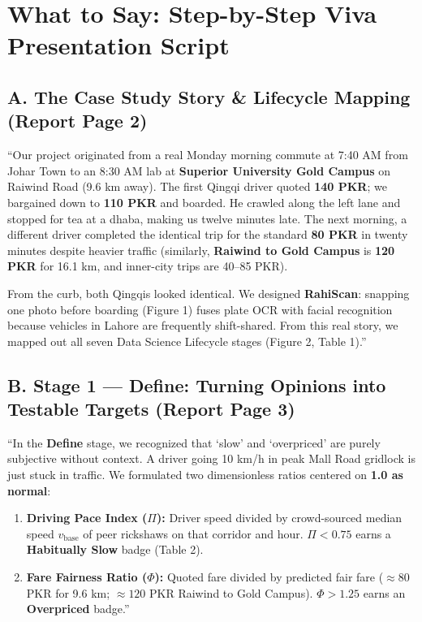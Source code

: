 \documentclass[10pt, a4paper]{article}
\begin{document}
\section{What to Say: Step-by-Step Viva Presentation Script}

\subsection{A. The Case Study Story \& Lifecycle Mapping (Report Page 2)}
\begin{speaking}
\footnotesize
``Our project originated from a real Monday morning commute at 7:40 AM from Johar Town to an 8:30 AM lab at \textbf{Superior University Gold Campus} on Raiwind Road (9.6 km away). The first Qingqi driver quoted \textbf{140 PKR}; we bargained down to \textbf{110 PKR} and boarded. He crawled along the left lane and stopped for tea at a dhaba, making us twelve minutes late. The next morning, a different driver completed the identical trip for the standard \textbf{80 PKR} in twenty minutes despite heavier traffic (similarly, \textbf{Raiwind to Gold Campus} is \textbf{120 PKR} for 16.1 km, and inner-city trips are 40--85 PKR).

From the curb, both Qingqis looked identical. We designed \textbf{RahiScan}: snapping one photo before boarding (Figure 1) fuses plate OCR with facial recognition because vehicles in Lahore are frequently shift-shared. From this real story, we mapped out all seven Data Science Lifecycle stages (Figure 2, Table 1).''
\end{speaking}

\subsection{B. Stage 1 --- Define: Turning Opinions into Testable Targets (Report Page 3)}
\begin{speaking}
\footnotesize
``In the \textbf{Define} stage, we recognized that `slow' and `overpriced' are purely subjective without context. A driver going 10 km/h in peak Mall Road gridlock is just stuck in traffic. We formulated two dimensionless ratios centered on \textbf{1.0 as normal}:
\begin{enumerate}\setlength{\itemsep}{0.8pt}\setlength{\parskip}{0pt}
  \item \textbf{Driving Pace Index (\(\Pi\)):} Driver speed divided by crowd-sourced median speed \(v_{\mathrm{base}}\) of peer rickshaws on that corridor and hour. \(\Pi < 0.75\) earns a \textbf{Habitually Slow} badge (Table 2).
  \item \textbf{Fare Fairness Ratio (\(\Phi\)):} Quoted fare divided by predicted fair fare (\(\approx 80\) PKR for 9.6 km; \(\approx 120\) PKR Raiwind to Gold Campus). \(\Phi > 1.25\) earns an \textbf{Overpriced} badge.''
\end{enumerate}
\end{speaking}
\end{document}
